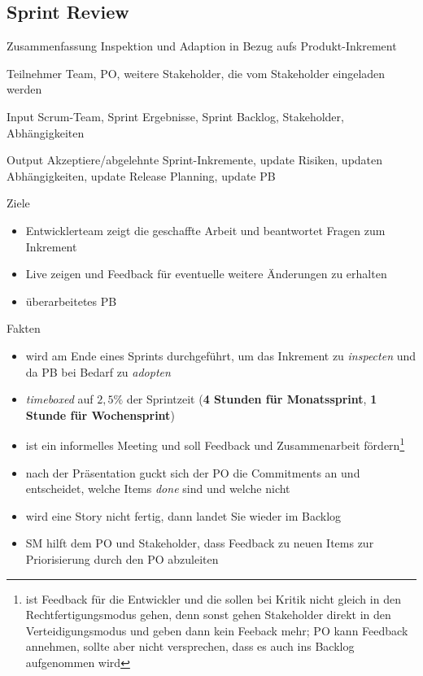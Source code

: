 \subsection{Sprint Review}
\begin{Beschreibungfett}[Zusammenfassung]
  \item [Zusammenfassung] Inspektion und Adaption in Bezug aufs Produkt-Inkrement
  \item [Teilnehmer] Team, PO, weitere Stakeholder, die vom Stakeholder eingeladen werden
  \item [Input] Scrum-Team, Sprint Ergebnisse, Sprint Backlog, Stakeholder, Abhängigkeiten
  \item [Output] Akzeptiere/abgelehnte Sprint-Inkremente, update Risiken, updaten Abhängigkeiten,
    update Release Planning, update PB
  \item [Ziele]
    \begin{itemize}
      \item Entwicklerteam zeigt die geschaffte Arbeit und beantwortet Fragen zum Inkrement
      \item Live zeigen und Feedback für eventuelle weitere Änderungen zu erhalten
      \item überarbeitetes PB
    \end{itemize}
  \item [Fakten]
  \begin{itemize}
    \item wird am Ende eines Sprints durchgeführt, um das Inkrement zu \textit{inspecten} und da PB bei
      Bedarf zu \textit{adopten}
    \item \textit{timeboxed} auf $2,5\%$ der Sprintzeit (\textbf{4 Stunden für Monatssprint}, \textbf{1 Stunde für Wochensprint})
    \item ist ein informelles Meeting und soll Feedback und Zusammenarbeit fördern\footnote{ist
        Feedback für die Entwickler und die sollen bei Kritik nicht gleich in den
        Rechtfertigungsmodus gehen, denn sonst gehen Stakeholder direkt in den
        Verteidigungsmodus und geben dann kein Feeback mehr; PO kann Feedback annehmen, sollte aber
        nicht versprechen, dass es auch ins Backlog aufgenommen wird}
    \item nach der Präsentation guckt sich der PO die Commitments an und entscheidet, welche Items
      \textit{done} sind und welche nicht
    \item wird eine Story nicht fertig, dann landet Sie wieder im Backlog
    \item SM hilft dem PO und Stakeholder, dass Feedback zu neuen Items zur
      Priorisierung durch den PO abzuleiten
  \end{itemize}
\end{Beschreibungfett}


